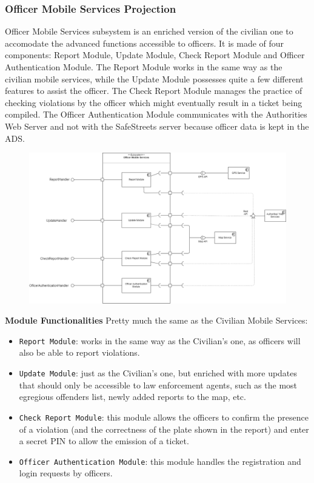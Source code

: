 \documentclass[12pt,a4paper]{article}
\begin{document}
\subsubsection{Officer Mobile Services Projection}
Officer Mobile Services subsystem is an enriched version of the civilian one to accomodate the advanced functions accessible to officers. It is made of four components: Report Module, Update Module, Check Report Module and Officer Authentication Module.
The Report Module works in the same way as the civilian mobile services, while the Update Module possesses quite a few different features to assist the officer. The Check Report Module manages the practice of checking violations by the officer
which might eventually result in a ticket being compiled. The Officer Authentication Module communicates with the Authorities Web Server and not with the SafeStreets server because officer data is kept in the ADS. 
\begin{figure}[H]
				\centering
					\begin{adjustwidth}{-25mm}{-25mm}
					        \includegraphics[width=0.9\paperwidth]{Images/OfficerMobileServicesProjection}
					\end{adjustwidth}
			\end{figure}
\textbf{Module Functionalities}
Pretty much the same as the Civilian Mobile Services:
\begin{itemize}
	\item \texttt{Report Module}: works in the same way as the Civilian's one, as officers will also be able to report violations.
	\item \texttt{Update Module}: just as the Civilian's one, but enriched with more updates that should only be accessible to law enforcement agents, such as the most egregious offenders list, newly added reports to the map, etc.
	\item \texttt{Check Report Module}: this module allows the officers to confirm the presence of a violation (and the correctness of the plate shown in the report) and enter a secret PIN to allow the emission of a ticket.
	\item \texttt{Officer Authentication Module}: this module handles the registration and login requests by officers.

\end{itemize}
\newpage
\end{document}
